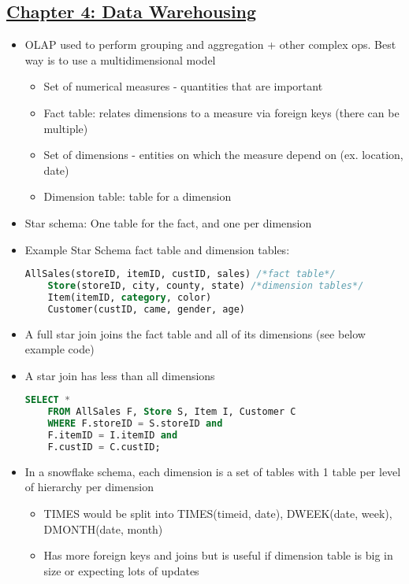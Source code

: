 \documentclass[8pt,landscape,a4paper, fleqn, dvipsnames]{extarticle}
\begin{document}
\begin{multicols*}{4}
\section*{\ul{Chapter 4: Data Warehousing}}
\begin{itemize}
    \item OLAP used to perform grouping and aggregation + other complex ops. Best way is to use a multidimensional model
    \begin{itemize}
        \item Set of numerical measures - quantities that are important
        \item Fact table: relates dimensions to a measure via foreign keys (there can be multiple)
        \item Set of dimensions - entities on which the measure depend on (ex. location, date)
        \item Dimension table: table for a dimension
    \end{itemize}
    \item Star schema: One table for the fact, and one per dimension
    \item Example Star Schema fact table and dimension tables: 
    \begin{lstlisting}[language=SQL]
    AllSales(storeID, itemID, custID, sales) /*fact table*/
    Store(storeID, city, county, state) /*dimension tables*/
    Item(itemID, category, color)
    Customer(custID, came, gender, age)
    \end{lstlisting}
    \item A full star join joins the fact table and all of its dimensions (see below example code)
    \item A star join has less than all dimensions
    \begin{lstlisting}[language=SQL]
SELECT *
    FROM AllSales F, Store S, Item I, Customer C
    WHERE F.storeID = S.storeID and
    F.itemID = I.itemID and
    F.custID = C.custID;
    \end{lstlisting}
    \item In a snowflake schema, each dimension is a set of tables with 1 table per level of hierarchy per dimension
    \begin{itemize}
        \item TIMES would be split into TIMES(timeid, date), DWEEK(date, week), DMONTH(date, month)
        \item Has more foreign keys and joins but is useful if dimension table is big in size or expecting lots of updates
    \end{itemize}
    

\end{itemize}
\end{multicols*}
\end{document}

